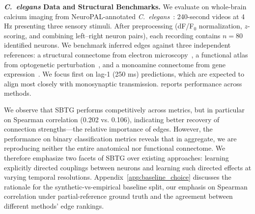 \documentclass{article}
\theoremstyle{plain}
\theoremstyle{definition}
\theoremstyle{remark}
\newcommand{\1}{\mathbf{1}}
\begin{document}
\begin{table}[t]
\begin{minipage}[t]{0.48\linewidth}
\end{minipage}
\vspace{-4mm}
\end{table}

\textbf{\textit{C.~elegans} Data and Structural Benchmarks.} We evaluate on whole-brain calcium imaging from NeuroPAL-annotated \emph{C.~elegans}~\citep{Yemini2021}: 240-second videos at 4 Hz presenting three sensory stimuli. After preprocessing (dF/F$_0$ normalization, $z$-scoring, and combining left--right neuron pairs), each recording contains $n = 80$ identified neurons. We benchmark inferred edges against three independent references: a structural connectome from electron microscopy~\citep{Cook2019}, a functional atlas from optogenetic perturbation~\citep{Randi2023}, and a monoamine connectome from gene expression~\citep{bentley2016multilayer}. We focus first on lag-1 (250 ms) predictions, which are expected to align most closely with monosynaptic transmission.  reports performance across methods.

We observe that SBTG performs competitively across metrics, but in particular on Spearman correlation (0.202 vs. 0.106), indicating better recovery of connection strengths---the relative importance of edges. However, the performance on binary classification metrics reveals that in aggregate, we are reproducing neither the entire anatomical nor functional connectome. We therefore emphasize two facets of SBTG over existing approaches: learning explicitly directed couplings between neurons and learning such directed effects at varying temporal resolutions. Appendix~\ref{app:baseline_choice} discusses the rationale for the synthetic-vs-empirical baseline split, our emphasis on Spearman correlation under partial-reference ground truth and the agreement between different methods’ edge rankings.


\end{document}
